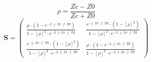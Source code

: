 \[ \rho =  \frac{ Zc-Z0 }{ Zc + Z0 } \]
\[ \mathbf{S} = \left(\begin{array}{cc}  \frac{ \rho \cdot \left( 1 -
e^{-2 \cdot  j \cdot 2 \pi \cdot f \cdot Td }  \right) }{ 1 - \left[
\rho \right]^2 \cdot e^{-2 \cdot  j \cdot 2 \pi \cdot f \cdot Td }  }
&  \frac{ e^{- j \cdot 2 \pi \cdot f \cdot Td} \cdot \left( 1 - \left[
\rho \right] ^2 \right) }{ 1 - \left[ \rho \right]^2 \cdot e^{-2 \cdot
j \cdot 2 \pi \cdot f \cdot Td }  }  \\  \frac{ e^{- j \cdot 2 \pi
\cdot f \cdot Td} \cdot \left( 1 - \left[ \rho \right] ^2 \right) }{ 1
- \left[ \rho \right]^2 \cdot e^{-2 \cdot  j \cdot 2 \pi \cdot f \cdot
Td }  }  &  \frac{ \rho \cdot \left( 1 - e^{-2 \cdot  j \cdot 2 \pi
\cdot f \cdot Td }  \right) }{ 1 - \left[ \rho \right]^2 \cdot e^{-2
\cdot  j \cdot 2 \pi \cdot f \cdot Td }  } \end{array}\right) \]
